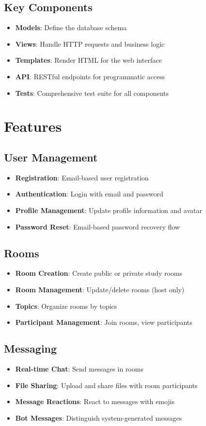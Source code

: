 \documentclass[11pt]{article}
\begin{document}
\subsection{Key Components}
\begin{itemize}
  \item \textbf{Models}: Define the database schema
  \item \textbf{Views}: Handle HTTP requests and business logic
  \item \textbf{Templates}: Render HTML for the web interface
  \item \textbf{API}: RESTful endpoints for programmatic access
  \item \textbf{Tests}: Comprehensive test suite for all components
\end{itemize}

\section{Features}

\subsection{User Management}
\begin{itemize}
  \item \textbf{Registration}: Email-based user registration
  \item \textbf{Authentication}: Login with email and password
  \item \textbf{Profile Management}: Update profile information and avatar
  \item \textbf{Password Reset}: Email-based password recovery flow
\end{itemize}

\subsection{Rooms}
\begin{itemize}
  \item \textbf{Room Creation}: Create public or private study rooms
  \item \textbf{Room Management}: Update/delete rooms (host only)
  \item \textbf{Topics}: Organize rooms by topics
  \item \textbf{Participant Management}: Join rooms, view participants
\end{itemize}

\subsection{Messaging}
\begin{itemize}
  \item \textbf{Real-time Chat}: Send messages in rooms
  \item \textbf{File Sharing}: Upload and share files with room participants
  \item \textbf{Message Reactions}: React to messages with emojis
  \item \textbf{Bot Messages}: Distinguish system-generated messages
\end{itemize}
\end{document}
